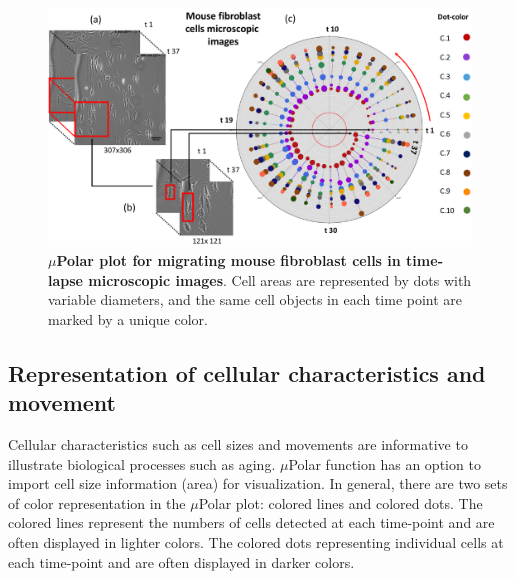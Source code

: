 \documentclass[conference]{IEEEtran}
\begin{document}
\begin{figure}
\centering
\includegraphics[width=\textwidth,height=10 cm]{Patterns/microscopic.pdf}
\caption{ \textbf{$\mu$Polar plot for migrating mouse fibroblast cells in time-lapse microscopic images}. Cell areas are represented by dots with variable diameters, and the same cell objects in each time point are marked by a unique color. 
}
\label{fig:scopic}
\end{figure}

\subsection{Representation of cellular characteristics and movement }
Cellular characteristics such as cell sizes and movements are informative to illustrate biological processes such as aging. $\mu$Polar function has an option to import cell size information (area) for visualization. 
In general, there are two sets of color representation in the $\mu$Polar plot: colored lines and colored dots. The colored lines represent the numbers of cells detected at each time-point and are often displayed in lighter colors. The colored dots representing individual cells at each time-point and are often displayed in darker colors.
\end{document}
